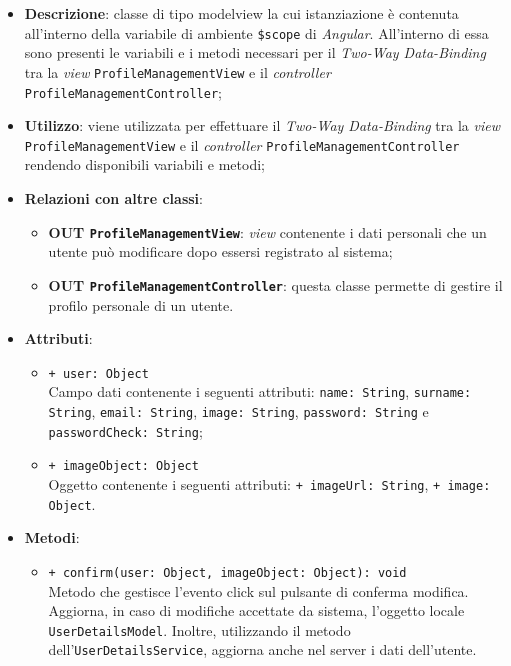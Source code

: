 	\begin{itemize}
		\item \textbf{Descrizione}: classe di tipo modelview la cui istanziazione è contenuta all'interno della variabile di ambiente \texttt{\$scope} di \textit{Angular}. All'interno di essa sono presenti le variabili e i metodi necessari per il \textit{Two-Way Data-Binding} tra la \textit{view} \texttt{ProfileManagementView} e il \textit{controller} \texttt{ProfileManagementController};
		\item \textbf{Utilizzo}: viene utilizzata per effettuare il \textit{Two-Way Data-Binding} tra la \textit{view} \texttt{ProfileManagementView} e il \textit{controller} \texttt{ProfileManagementController} rendendo disponibili variabili e metodi;
		\item \textbf{Relazioni con altre classi}: 
		\begin{itemize}
			\item \textbf{OUT \texttt{ProfileManagementView}}: \textit{view} contenente i dati personali che un utente può modificare dopo essersi registrato al sistema; 
			\item \textbf{OUT \texttt{ProfileManagementController}}: questa classe permette di gestire il profilo personale di un utente.
		\end{itemize}
		\item \textbf{Attributi}: 
		\begin{itemize}
			\item \texttt{+ user: Object} \\ Campo dati contenente i seguenti attributi: \texttt{name: String}, \texttt{surname: String}, \texttt{email: String}, \texttt{image: String}, \texttt{password: String} e \texttt{passwordCheck: String};
			\item \texttt{+ imageObject: Object} \\ Oggetto contenente i seguenti attributi: \texttt{+ imageUrl: String}, \texttt{+ image: Object}.
		\end{itemize}
		\item \textbf{Metodi}: 
		\begin{itemize}
			\item \texttt{+ confirm(user: Object, imageObject: Object): void} \\
			Metodo che gestisce l’evento click sul pulsante di conferma modifica. Aggiorna, in caso di modifiche accettate da sistema, l'oggetto locale \texttt{UserDetailsModel}. Inoltre, utilizzando il metodo dell'\texttt{UserDetailsService}, aggiorna anche nel server i dati dell'utente.
		\end{itemize}
	\end{itemize}	

